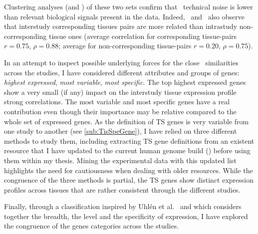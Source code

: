Clustering analyses (and \Welchttest) of these two sets
confirm that \Rnaseq\ technical noise is
lower than relevant biological signals present in the data.
Indeed,~\cite{Sudmant2015-zt,Danielsson2015-cn,Yu2015-uh} and~\cite{Uhlen:2016}
also observe that interstudy corresponding tissues pairs are more related than
intrastudy non-corresponding tissue ones
(average correlation for corresponding tissue-pairs $r=0.75$, $\rho=0.88$;
average for non-corresponding tissue-pairs $r=0.20$, $\rho=0.75$).

In an attempt to inspect possible underlying forces for the close \treps\
similarities across the studies,
I have considered different attributes and groups of genes:
\emph{highest expressed}, \emph{most variable}, \emph{most specific}.
The top highest expressed genes show a very small (if any) impact on
the interstudy tissue expression profile strong correlations.
The most variable and most specific genes have a real contribution even though
their importance may be relative compared to the whole set of expressed genes.
As the definition of \gls{TS} genes is very variable from one study to another
(see \cref{sub:TisSpeGene}),
I have relied on three different methods to study them,
including extracting \gls{TS} gene definitions
from an existent resource
that I have updated to the current human genome build ()
before using them within my thesis.
Mining the experimental data with this updated list highlights
the need for cautiousness when dealing with older resources.
While the congruence of the three methods is partial,
the \gls{TS} genes show distinct expression profiles across tissues
that are rather consistent through the different studies.

Finally, through a classification inspired
by Uhlén et al.\ 
and which considers together the breadth, the level and the specificity of expression,
I have explored the congruence of the genes categories across the studies.


